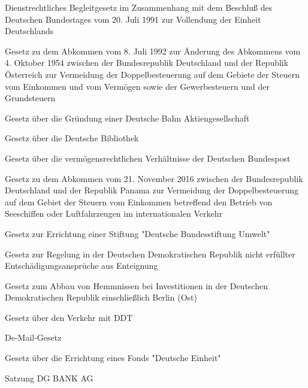 \item[{DBeglG}] Dienstrechtliches Begleitgesetz im Zusammenhang mit dem Beschluß des Deutschen Bundestages vom 20. Juli 1991 zur Vollendung der Einheit Deutschlands

\item[{DBestAUTAbkG}] Gesetz zu dem Abkommen vom 8. Juli 1992 zur Änderung des Abkommens vom 4. Oktober 1954 zwischen der Bundesrepublik Deutschland und der Republik Österreich zur Vermeidung der Doppelbesteuerung auf dem Gebiete der Steuern vom Einkommen und vom Vermögen sowie der Gewerbesteuern und der Grundsteuern

\item[{DBGrG}] Gesetz über die Gründung einer Deutsche Bahn Aktiengesellschaft

\item[{DBiblG}] Gesetz über die Deutsche Bibliothek

\item[{DBPVermG}] Gesetz über die vermögensrechtlichen Verhältnisse der Deutschen Bundespost

\item[{DBSeeLuftAbkG-PAN}] Gesetz zu dem Abkommen vom 21. November 2016 zwischen der Bundesrepublik Deutschland und der Republik Panama zur Vermeidung der Doppelbesteuerung auf dem Gebiet der Steuern vom Einkommen betreffend den Betrieb von Seeschiffen oder Luftfahrzeugen im internationalen Verkehr

\item[{DBUStiftG}] Gesetz zur Errichtung einer Stiftung "Deutsche Bundesstiftung Umwelt"

\item[{DDR-EErfG}] Gesetz zur Regelung in der Deutschen Demokratischen Republik nicht erfüllter Entschädigungsansprüche aus Enteignung

\item[{DDRIG}] Gesetz zum Abbau von Hemmnissen bei Investitionen in der Deutschen Demokratischen Republik einschließlich Berlin (Ost)

\item[{DDTG}] Gesetz über den Verkehr mit DDT

\item[{De-Mail-G}] De-Mail-Gesetz

\item[{DEFG}] Gesetz über die Errichtung eines Fonds "Deutsche Einheit"

\item[{DGBankSa}] Satzung DG BANK AG


